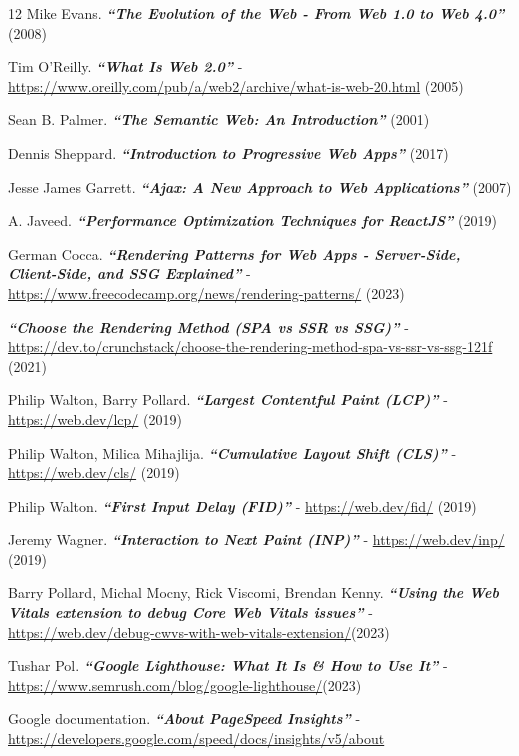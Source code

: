 \documentclass[12pt, a4paper]{report}
\begin{document}
\begin{thebibliography} {12}
	 Mike Evans. \textbf{\textit{“The Evolution of the Web - From Web 1.0 to Web 4.0”}} (2008)
	
	Tim O'Reilly. \textbf{\textit{“What Is Web 2.0”}} - \url{https://www.oreilly.com/pub/a/web2/archive/what-is-web-20.html} (2005)
	
	Sean B. Palmer. \textbf{\textit{“The Semantic Web: An Introduction”}} (2001)
	
	Dennis Sheppard. \textbf{\textit{“Introduction to Progressive Web Apps”}} (2017)

	Jesse James Garrett. \textbf{\textit{“Ajax: A New Approach to Web Applications”}} (2007)

	A. Javeed. \textbf{\textit{“Performance Optimization Techniques for ReactJS”}} (2019)

	German Cocca. \textbf{\textit{“Rendering Patterns for Web Apps - Server-Side, Client-Side, and SSG Explained”}} - \url{https://www.freecodecamp.org/news/rendering-patterns/} (2023)
	
	\textbf{\textit{“Choose the Rendering Method (SPA vs SSR vs SSG)”}} - \url{https://dev.to/crunchstack/choose-the-rendering-method-spa-vs-ssr-vs-ssg-121f} (2021)
	
	Philip Walton, Barry Pollard. \textbf{\textit{“Largest Contentful Paint (LCP)”}} - \url{https://web.dev/lcp/} (2019)
	
	Philip Walton, Milica Mihajlija. \textbf{\textit{“Cumulative Layout Shift (CLS)”}} - \url{https://web.dev/cls/} (2019)
	
	Philip Walton. \textbf{\textit{“First Input Delay (FID)”}} - \url{https://web.dev/fid/} (2019)

	Jeremy Wagner. \textbf{\textit{“Interaction to Next Paint (INP)”}} - \url{https://web.dev/inp/} (2019)

	Barry Pollard, Michal Mocny, Rick Viscomi, Brendan Kenny. \textbf{\textit{“Using the Web Vitals extension to debug Core Web Vitals issues”}} - \url{https://web.dev/debug-cwvs-with-web-vitals-extension/}(2023)
	
	Tushar Pol. \textbf{\textit{“Google Lighthouse: What It Is \& How to Use It”}} - \url{https://www.semrush.com/blog/google-lighthouse/}(2023)
	
	Google documentation. \textbf{\textit{“About PageSpeed Insights”}} - \url{https://developers.google.com/speed/docs/insights/v5/about}
	

\end{thebibliography}
\end{document}
